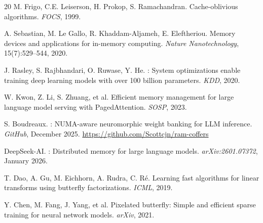 \documentclass[10pt,twocolumn]{article}
\begin{document}
\begin{thebibliography}{20}
M. Frigo, C.E. Leiserson, H. Prokop, S. Ramachandran.
\newblock Cache-oblivious algorithms.
\newblock \emph{FOCS}, 1999.

A. Sebastian, M. Le Gallo, R. Khaddam-Aljameh, E. Eleftheriou.
\newblock Memory devices and applications for in-memory computing.
\newblock \emph{Nature Nanotechnology}, 15(7):529--544, 2020.

J. Rasley, S. Rajbhandari, O. Ruwase, Y. He.
: System optimizations enable training deep learning models with over 100 billion parameters.
\newblock \emph{KDD}, 2020.

W. Kwon, Z. Li, S. Zhuang, et al.
\newblock Efficient memory management for large language model serving with {PagedAttention}.
\newblock \emph{SOSP}, 2023.

S. Boudreaux.
: {NUMA}-aware neuromorphic weight banking for {LLM} inference.
\newblock \emph{GitHub}, December 2025.
\newblock \url{https://github.com/Scottcjn/ram-coffers}

DeepSeek-AI.
: Distributed memory for large language models.
\newblock \emph{arXiv:2601.07372}, January 2026.

T. Dao, A. Gu, M. Eichhorn, A. Rudra, C. R\'{e}.
\newblock Learning fast algorithms for linear transforms using butterfly factorizations.
\newblock \emph{ICML}, 2019.

Y. Chen, M. Fang, J. Yang, et al.
\newblock Pixelated butterfly: Simple and efficient sparse training for neural network models.
\newblock \emph{arXiv}, 2021.

\end{thebibliography}
\end{document}
